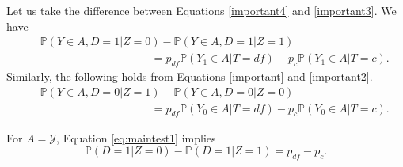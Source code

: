 \documentclass[12pt]{article}
\theoremstyle{plain}
\theoremstyle{definition}
\theoremstyle{remark}
\begin{document}
Let us take the difference between Equations \eqref{important4} and \eqref{important3}. We have
\begin{eqnarray}
&&\mathbb{P}(Y \in A, D=1  \vert  Z=0)-\mathbb{P}(Y \in A, D=1  \vert  Z=1) \label{eq:maintest1}\\
&&\qquad \qquad \qquad \qquad \qquad =p_{df}\mathbb{P}(Y_1 \in A  \vert  T=df) - p_c \mathbb{P}(Y_1 \in A  \vert  T=c).\nonumber
\end{eqnarray}
Similarly, the following holds from Equations \eqref{important} and \eqref{important2}. 
\begin{eqnarray}
&& \mathbb{P}(Y \in A, D=0  \vert  Z=1)-\mathbb{P}(Y \in A, D=0  \vert  Z=0) \label{eq:maintest2}\\
&&\qquad \qquad \qquad \qquad \qquad = p_{df}\mathbb{P}(Y_0 \in A  \vert  T=df) - p_c \mathbb{P}(Y_0 \in A  \vert  T=c).\nonumber 
\end{eqnarray}

For $A=\mathcal{Y}$, Equation \eqref{eq:maintest1} implies
\begin{equation}
\mathbb{P}(D=1  \vert  Z=0)-\mathbb{P}(D=1  \vert  Z=1)=p_{df}-p_c. \label{eq:maintest3}
\end{equation}
\end{document}
